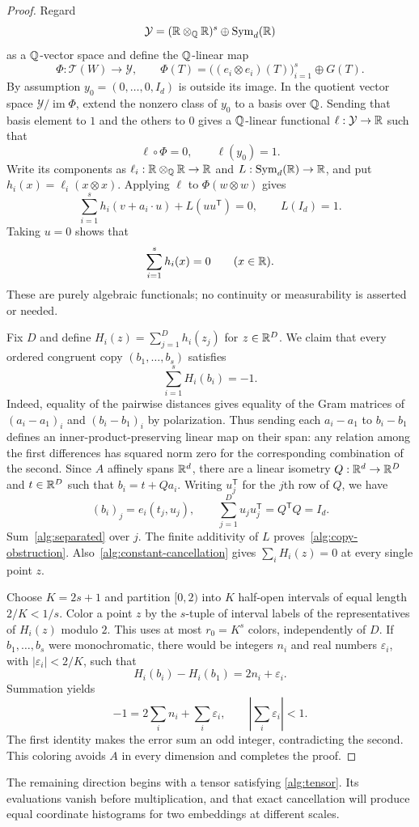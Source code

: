 \begin{proof}
Regard
\[
 \mathcal Y=(\mathbb R\otimes_{\mathbb Q}\mathbb R)^s\oplus\operatorname{Sym}_d(\mathbb R)
\]
as a $\mathbb Q$-vector space and define the $\mathbb Q$-linear map
\[
 \Phi:\mathcal T(W)\longrightarrow\mathcal Y,
 \qquad
 \Phi(T)=\bigl((e_i\otimes e_i)(T)\bigr)_{i=1}^s\oplus G(T).
\]
By assumption $y_0=(0,\ldots,0,I_d)$ is outside its image.
In the quotient vector space $\mathcal Y/\operatorname{im}\Phi$, extend
the nonzero class of $y_0$ to a basis over $\mathbb Q$.
Sending that basis element to $1$ and the others to $0$ gives a
$\mathbb Q$-linear functional $\ell:\mathcal Y\to\mathbb R$ such that
\[
 \ell\circ\Phi=0,\qquad \ell(y_0)=1.
\]
Write its components as $\ell_i:\mathbb R\otimes_{\mathbb Q}\mathbb R\to\mathbb R$ and
$L:\operatorname{Sym}_d(\mathbb R)\to\mathbb R$, and put $h_i(x)=\ell_i(x\otimes x)$.
Applying $\ell$ to $\Phi(w\otimes w)$ gives
\begin{equation}\label{alg:separated}
 \sum_{i=1}^s h_i(v+a_i\cdot u)+L(uu^{\mathsf T})=0,
 \qquad L(I_d)=1.
\end{equation}
Taking $u=0$ shows that
\begin{equation}\label{alg:constant-cancellation}
 \sum_{i=1}^s h_i(x)=0\qquad(x\in\mathbb R).
\end{equation}
These are purely algebraic functionals; no continuity or measurability is
asserted or needed.

Fix $D$ and define
$H_i(z)=\sum_{j=1}^D h_i(z_j)$ for $z\in\mathbb R^D$.
We claim that every ordered congruent copy $(b_1,\ldots,b_s)$ satisfies
\begin{equation}\label{alg:copy-obstruction}
 \sum_{i=1}^s H_i(b_i)=-1.
\end{equation}
Indeed, equality of the pairwise distances gives equality of the Gram
matrices of $(a_i-a_1)_i$ and $(b_i-b_1)_i$ by polarization.
Thus sending each $a_i-a_1$ to $b_i-b_1$ defines an inner-product-preserving
linear map on their span: any relation among the first differences has
squared norm zero for the corresponding combination of the second.
Since $A$ affinely spans $\mathbb R^d$, there are a linear isometry
$Q:\mathbb R^d\to\mathbb R^D$ and $t\in\mathbb R^D$ such that $b_i=t+Qa_i$.
Writing $u_j^{\mathsf T}$ for the $j$th row of $Q$, we have
\[
 (b_i)_j=e_i(t_j,u_j),\qquad
 \sum_{j=1}^D u_ju_j^{\mathsf T}=Q^{\mathsf T}Q=I_d.
\]
Sum~\eqref{alg:separated} over $j$.
The finite additivity of $L$ proves~\eqref{alg:copy-obstruction}.
Also~\eqref{alg:constant-cancellation} gives
$\sum_iH_i(z)=0$ at every single point $z$.

Choose $K=2s+1$ and partition $[0,2)$ into $K$ half-open intervals
of equal length $2/K<1/s$.  Color a point $z$ by the $s$-tuple of interval
labels of the representatives of $H_i(z)$ modulo $2$.
This uses at most $r_0=K^s$ colors, independently of $D$.
If $b_1,\ldots,b_s$ were monochromatic, there would be integers $n_i$
and real numbers $\varepsilon_i$, with $|\varepsilon_i|<2/K$, such that
\[
 H_i(b_i)-H_i(b_1)=2n_i+\varepsilon_i.
\]
Summation yields
\[
 -1=2\sum_i n_i+\sum_i\varepsilon_i,
 \qquad \left|\sum_i\varepsilon_i\right|<1.
\]
The first identity makes the error sum an odd integer, contradicting the
second.  This coloring avoids $A$ in every dimension and completes the
proof.
\end{proof}

The remaining direction begins with a tensor satisfying
\eqref{alg:tensor}.  Its evaluations vanish before multiplication, and
that exact cancellation will produce equal coordinate histograms for
two embeddings at different scales.
